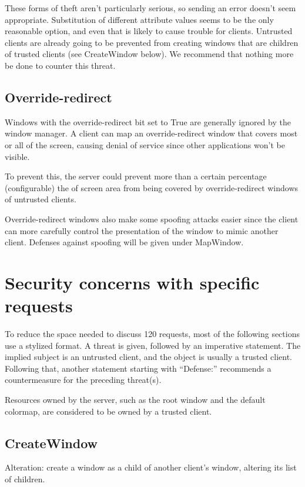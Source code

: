 These forms of theft aren't particularly serious, so sending an error
doesn't seem appropriate.  Substitution of different attribute values
seems to be the only reasonable option, and even that is likely to
cause trouble for clients.  Untrusted clients are already going to be
prevented from creating windows that are children of trusted clients
(see CreateWindow below).  We recommend that nothing more be done to
counter this threat.


\subsection{Override-redirect}

Windows with the override-redirect bit set to True are generally
ignored by the window manager.  A client can map an override-redirect
window that covers most or all of the screen, causing denial of
service since other applications won't be visible.

To prevent this, the server could prevent more than a certain
percentage (configurable) the of screen area from being covered by
override-redirect windows of untrusted clients.

Override-redirect windows also make some spoofing attacks easier since
the client can more carefully control the presentation of the window
to mimic another client.  Defenses against spoofing will be
given under MapWindow.

\section{Security concerns with specific requests}

To reduce the space needed to discuss 120 requests, most of the
following sections use a stylized format.  A threat is given, followed
by an imperative statement.  The implied subject is an untrusted
client, and the object is usually a trusted client.  Following that,
another statement starting with ``Defense:'' recommends a
countermeasure for the preceding threat(s).

Resources owned by the server, such as the root window and the default
colormap, are considered to be owned by a trusted client.


\subsection{CreateWindow}

Alteration: create a window as a child of another client's window,
altering its list of children.

